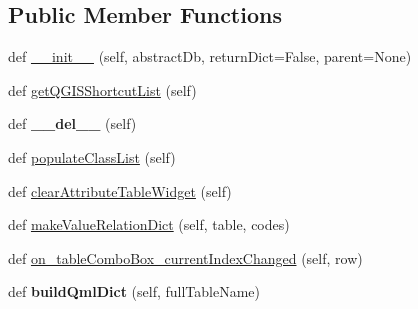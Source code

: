 \subsection*{Public Member Functions}
\begin{DoxyCompactItemize}
\item 
def \mbox{\hyperlink{class_dsg_tools_1_1_production_tools_1_1_field_tool_box_1_1field__setup_1_1_field_setup_a7b9b3d0d6d1ec937376d265919a0b37f}{\+\_\+\+\_\+init\+\_\+\+\_\+}} (self, abstract\+Db, return\+Dict=False, parent=None)
\item 
def \mbox{\hyperlink{class_dsg_tools_1_1_production_tools_1_1_field_tool_box_1_1field__setup_1_1_field_setup_aacb16eac193873596242500308f5b612}{get\+Q\+G\+I\+S\+Shortcut\+List}} (self)
\item 
\mbox{\label{class_dsg_tools_1_1_production_tools_1_1_field_tool_box_1_1field__setup_1_1_field_setup_ac193977011eb4dcb0785847796179187}} 
def {\bfseries \+\_\+\+\_\+del\+\_\+\+\_\+} (self)
\item 
def \mbox{\hyperlink{class_dsg_tools_1_1_production_tools_1_1_field_tool_box_1_1field__setup_1_1_field_setup_a3f4f3e1bb22836cfb817c95336854602}{populate\+Class\+List}} (self)
\item 
def \mbox{\hyperlink{class_dsg_tools_1_1_production_tools_1_1_field_tool_box_1_1field__setup_1_1_field_setup_a6fcd8df6d96e18b4c13b6c003e2adc56}{clear\+Attribute\+Table\+Widget}} (self)
\item 
def \mbox{\hyperlink{class_dsg_tools_1_1_production_tools_1_1_field_tool_box_1_1field__setup_1_1_field_setup_a4540129ad03d6f901709e4a9a4842975}{make\+Value\+Relation\+Dict}} (self, table, codes)
\item 
def \mbox{\hyperlink{class_dsg_tools_1_1_production_tools_1_1_field_tool_box_1_1field__setup_1_1_field_setup_a6e2d8c353c167c84942872b12d46306f}{on\+\_\+table\+Combo\+Box\+\_\+current\+Index\+Changed}} (self, row)
\item 
\mbox{\label{class_dsg_tools_1_1_production_tools_1_1_field_tool_box_1_1field__setup_1_1_field_setup_a24e9b422cc556c5af9796575811dcac7}} 
def {\bfseries build\+Qml\+Dict} (self, full\+Table\+Name)
\item 
\mbox{\label{class_dsg_tools_1_1_production_tools_1_1_field_tool_box_1_1field__setup_1_1_field_setup_aa643a6015393ff002d71c6ec266b5ac0}} 

\end{DoxyCompactItemize}
